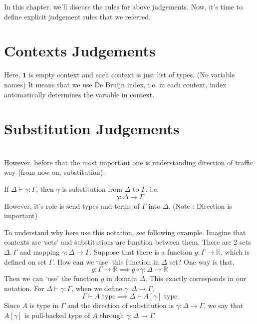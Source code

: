 \documentclass[12pt, a4paper, openany, twoside]{book}
\theoremstyle{definition}
\theoremstyle{remark}
\theoremstyle{plain}
\numberwithin{equation}{section}
\begin{document}
In this chapter, we'll discuss the rules for above judgements. 
Now, it's time to define explicit judgement rules that we referred. 
\newpage
\section{Contexts Judgements}
\begin{tcolorbox}[colback=yellow!10!white,colframe=green!75!black,title=Construction 1.2.1.]\label{cx judgement}
\end{tcolorbox}
Here, $\mathbf{1}$ is empty context and each context is just list of types. (No variable names) It means that 
we use De Bruijn index, i.e. in each context, index automatically determines the variable in context. 

\section{Substitution Judgements}\label{subst judgement} \quad \\

However, before that the most 
important one is understanding direction of traffic way (from now on, substitution). 

\begin{tcolorbox}[colback=yellow!10!white,colframe=blue!75!black,title=Definition 1.3.1.]\label{1.3.1}
    If $\Delta \vdash \gamma : \Gamma$, then $\gamma$ is substitution from $\Delta$ to $\Gamma$. i.e. 
    \[\gamma : \Delta \rightarrow \Gamma\]
    However, it's role is send types and terms of $\Gamma$ into $\Delta$. (Note : Direction is important)
\end{tcolorbox}

\begin{tcolorbox}[colback=yellow!10!white,colframe=red!75!black,title=1.3.  Intuitions for direction of substitutions]\label{intuition}
    To understand why here use this notation, see following example. Imagine that contexts are \lq sets' 
    and substitutions are function between them. There are 2 sets $\Delta, \Gamma$ and mapping $\gamma : \Delta \rightarrow \Gamma$. 
    Suppose that there is a function $g : \Gamma \rightarrow \mathbb{R}$, which is defined on set $\Gamma$. How can we 
    \lq use' this function in $\Delta$ set? One way is that, 
    \[g : \Gamma \rightarrow \mathbb{R} \implies g \circ \gamma : \Delta \rightarrow \mathbb{R}\]
    Then we can \lq use' the function $g$ in domain $\Delta$. This exactly corresponds in our notation. 
    For $\Delta \vdash \gamma : \Gamma$, when we define $\gamma : \Delta \rightarrow \Gamma$, 
    \[\Gamma \vdash A \text{ type} \implies \Delta \vdash A[\gamma] \text{ type}\]
    Since $A$ is type in $\Gamma$ and the direction of substitution is $\gamma : \Delta \rightarrow \Gamma$, we say that 
    $A[\gamma]$ is pull-backed type of $A$ through $\gamma : \Delta \rightarrow \Gamma$. 
\end{tcolorbox}
\end{document}
